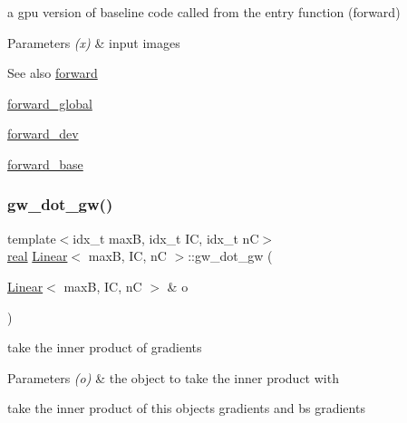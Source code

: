 a gpu version of baseline code called from the entry function (forward) 


\begin{DoxyParams}{Parameters}
{\em (x)} & input images \\
\hline
\end{DoxyParams}
\begin{DoxySeeAlso}{See also}
\hyperlink{structLinear_aed0294f2d1c2013f66d89a52474352e5}{forward} 

\hyperlink{softmaxcrossentropy_8h_a578aeeb166bd06e800d9b396eab48b35}{forward\+\_\+global} 

\hyperlink{structLinear_a2b86dba92137500810cbf3ed95ee1fcb}{forward\+\_\+dev} 

\hyperlink{structLinear_adb02d44e0558e4e26b9a550945cd3b7e}{forward\+\_\+base} 
\end{DoxySeeAlso}
\mbox{\label{structLinear_af920adb0c630cddb4f8012984784807c}} 
\subsubsection{\texorpdfstring{gw\+\_\+dot\+\_\+gw()}{gw\_dot\_gw()}}
{\footnotesize\ttfamily template$<$idx\+\_\+t maxB, idx\+\_\+t IC, idx\+\_\+t nC$>$ \\
\hyperlink{vgg__util_8h_a1082d08aaa761215ec83e7149f27ad16}{real} \hyperlink{structLinear}{Linear}$<$ maxB, IC, nC $>$\+::gw\+\_\+dot\+\_\+gw (\begin{DoxyParamCaption}\item[{\hyperlink{structLinear}{Linear}$<$ maxB, IC, nC $>$ \&}]{o }\end{DoxyParamCaption})\hspace{0.3cm}{\ttfamily [inline]}}



take the inner product of gradients 


\begin{DoxyParams}{Parameters}
{\em (o)} & the object to take the inner product with\\
\hline
\end{DoxyParams}
take the inner product of this object\textquotesingle{}s gradients and b\textquotesingle{}s gradients \mbox{\label{structLinear_a45f2c4c010a2451d39e0a7e736fd4a58}} 
